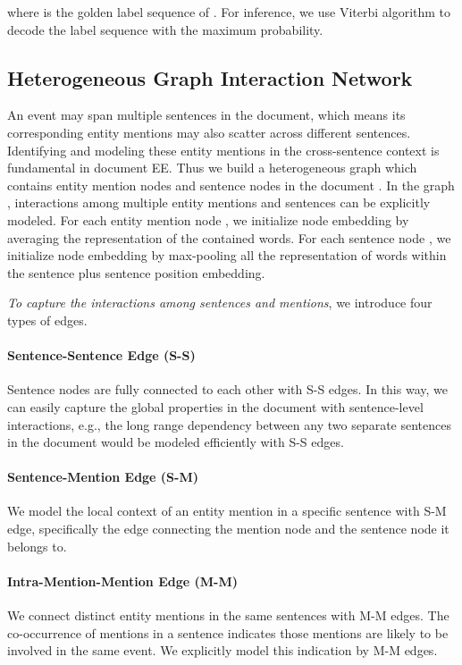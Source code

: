 \documentclass[11pt,a4paper]{article}
\begin{document}
where  is the golden label sequence of .
For inference, we use Viterbi algorithm to decode the label sequence with the maximum probability.

\subsection{Heterogeneous Graph Interaction Network}
\label{sec:git_structure}

An event may span multiple sentences in the document, which means its corresponding entity mentions may also scatter across different sentences. 
Identifying and modeling these entity mentions in the cross-sentence context is fundamental in document EE. 
Thus we build a heterogeneous graph  which contains entity mention nodes and sentence nodes in the document .
In the graph , 
interactions among multiple entity mentions and sentences can be explicitly modeled.
For each entity mention node , 
we initialize node embedding  by averaging the representation of the contained words.
For each sentence node ,
we initialize node embedding  by max-pooling all the representation of words within the sentence plus sentence position embedding.

\emph{To capture the interactions among sentences and mentions}, we introduce four types of edges.
    \paragraph{Sentence-Sentence Edge (S-S)} Sentence nodes are fully connected to each other with S-S edges. 
    In this way, we can easily capture the global properties in the document with sentence-level interactions, e.g., the long range dependency between any two separate sentences in the document would be modeled efficiently with S-S edges.
    \paragraph{Sentence-Mention Edge (S-M)} We model the local context of an entity mention in a specific sentence with S-M edge, specifically the edge connecting the mention node and the sentence node it belongs to.
    \paragraph{Intra-Mention-Mention Edge (M-M)} We connect distinct entity mentions in the same sentences with M-M edges. 
    The co-occurrence of mentions in a sentence indicates those mentions are likely to be involved in the same event. 
    We explicitly model this indication by M-M edges.
\end{document}
